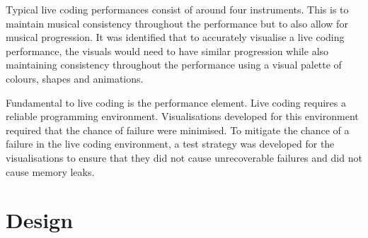 Typical live coding performances consist of around four instruments. This is to maintain musical consistency throughout the performance but to also allow for musical progression. It was identified that to accurately visualise a live coding performance, the visuals would need to have similar progression while also maintaining consistency throughout the performance using a visual palette of colours, shapes and animations.

Fundamental to live coding is the performance element. Live coding requires a reliable programming environment. Visualisations developed for this environment required that the chance of failure were minimised. To mitigate the chance of a failure in the live coding environment, a test strategy was developed for the visualisations to ensure that they did not cause unrecoverable failures and did not cause memory leaks.










\section{Design}

